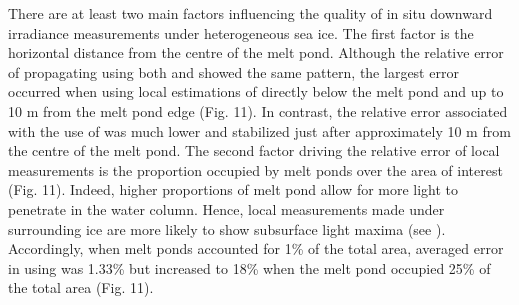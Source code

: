 There are at least two main factors influencing the quality of in situ downward irradiance measurements under heterogeneous sea ice. The first factor is the horizontal distance from the centre of the melt pond. Although the relative error of propagating \edzero{} using both \ked{} and \klu{} showed the same pattern, the largest error occurred when using local estimations of \ked{} directly below the melt pond and up to 10 m from the melt pond edge (Fig. 11). In contrast, the relative error associated with the use of \klu{} was much lower and stabilized just after approximately 10 m from the centre of the melt pond. The second factor driving the relative error of local measurements is the proportion occupied by melt ponds over the area of interest (Fig. 11). Indeed, higher proportions of melt pond allow for more light to penetrate in the water column. Hence, local measurements made under surrounding ice are more likely to show subsurface light maxima (see \citet{Frey2011}). Accordingly, when melt ponds accounted for 1\% of the total area, averaged error in \edz{} using \klu{} was 1.33\% but increased to 18\% when the melt pond occupied 25\% of the total area (Fig. 11).